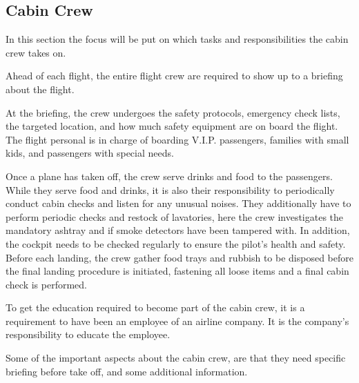 \subsection{Cabin Crew}
In this section the focus will be put on which tasks and responsibilities the cabin crew takes on. 

Ahead of each flight, the entire flight crew are required to show up to a briefing about the flight.

At the briefing, the crew undergoes the safety protocols, emergency check lists, the targeted location, and how much safety equipment are on board the flight. The flight personal is in charge of boarding V.I.P. passengers, families with small kids, and passengers with special needs.

Once a plane has taken off, the crew serve drinks and food to the passengers. While they serve food and drinks, it is also their responsibility to periodically conduct cabin checks and listen for any unusual noises. They additionally have to perform periodic checks and restock of lavatories, here the crew investigates the mandatory ashtray and if smoke detectors have been tampered with. In addition, the cockpit needs to be checked regularly to ensure the pilot's health and safety. Before each landing, the crew gather food trays and rubbish to be disposed before the final landing procedure is initiated, fastening all loose items and a final cabin check is performed.

To get the education required to become part of the cabin crew, it is a requirement to have been an employee of an airline company. It is the company’s responsibility to educate the employee. 

Some of the important aspects about the cabin crew, are that they need specific briefing before take off, and some additional information.

